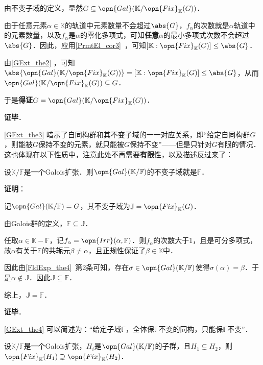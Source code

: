 由不变子域的定义，显然$G\subseteq\opn{Gal}(\mathbb{K}/\opn{Fix}_\mathbb{K}(G))$．

由于任意元素$\alpha\in\mathbb{K}$的轨道中元素数量不会超过$\abs{G}$，$f_\alpha$的次数就是$\alpha$轨道中的元素数量，以及$f_\alpha$是$\alpha$的零化多项式，可知\textbf{任意}$\alpha$的最小多项式次数不会超过$\abs{G}$．因此，应用\autoref{PrmtEl_cor3}~，可知$[\mathbb{K}:\opn{Fix}_\mathbb{K}(G)]\leq \abs{G}$．

由\autoref{GExt_the2} ，可知$\abs{\opn{Gal}(\mathbb{K}/\opn{Fix}_\mathbb{K}(G))}=[\mathbb{K}:\opn{Fix}_\mathbb{K}(G)]\leq\abs{G}$，从而$\opn{Gal}(\mathbb{K}/\opn{Fix}_\mathbb{K}(G))\subseteq G$．

于是\textbf{得证}$G = \opn{Gal}(\mathbb{K}/\opn{Fix}_\mathbb{K}(G))$．

\textbf{证毕}．


\autoref{GExt_the3} 暗示了自同构群和其不变子域的一一对应关系，即“给定自同构群$G$，则能被$G$保持不变的元素，就只能被$G$保持不变”——但是只针对$G$有限的情况．这也体现在以下性质中，注意此处不再需要\textbf{有限}性，以及描述反过来了：



\begin{theorem}{}\label{GExt_the4}
设$\mathbb{K}/\mathbb{F}$是一个Galois扩张．则$\opn{Gal}(\mathbb{K}/\mathbb{F})$的不变子域就是$\mathbb{F}$．
\end{theorem}

\textbf{证明}：

记$\opn{Gal}(\mathbb{K}/\mathbb{F})=G$，其不变子域为$\mathbb{J}=\opn{Fix}_\mathbb{K}(G)$．

由Galois群的定义，$\mathbb{F}\subseteq\mathbb{J}$．

任取$\alpha\in\mathbb{K}-\mathbb{F}$，记$f_\alpha=\opn{Irr}(\alpha, \mathbb{F})$．则$f_\alpha$的次数大于1，且是可分多项式，故$\alpha$有关于$\mathbb{F}$的共轭元$\beta\neq \alpha$，且正规性保证了$\beta\in\mathbb{K}$中．

因此由\autoref{FldExp_the4}~第2条可知，存在$\sigma\in\opn{Gal}(\mathbb{K}/\mathbb{F})$使得$\sigma(\alpha)=\beta$．于是$\alpha\not\in \mathbb{J}$．因此$\mathbb{J}\subseteq\mathbb{F}$．

综上，$\mathbb{J}=\mathbb{F}$．

\textbf{证毕}．


\autoref{GExt_the4} 可以简述为：“给定子域$\mathbb{F}$，全体保$\mathbb{F}$不变的同构，只能保$\mathbb{F}$不变”．


\begin{corollary}{}\label{GExt_cor1}
设$\mathbb{K}/\mathbb{F}$是一个Galois扩张，$H_i$是$\opn{Gal}(\mathbb{K}/\mathbb{F})$的子群，且$H_1\subsetneq H_2$，则$\opn{Fix}_\mathbb{K}(H_1)\supsetneq \opn{Fix}_\mathbb{K}(H_2)$．
\end{corollary}

